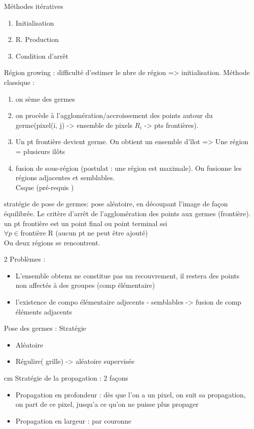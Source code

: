 \documentclass[11pt]{article}
\begin{document}
Méthodes itératives
\begin{enumerate}
	\item Initialisation
	\item R. Production
	\item Condition d'arrêt
\end{enumerate}

Région growing : difficulté d'estimer le nbre de région => initialisation. Méthode classique : 
\begin{enumerate}
	\item on sème des germes
	\item on procède à l'agglomération/accroissement des points autour du germe(pixel(i, j) -> ensemble de pixels $R_i$ -> pts frontières). 
	\item Un pt frontière devient germe. On obtient un ensemble d'îlot => Une région = plusieurs ilôts
	\item fusion de sous-région (postulat : une région est maximale). On fusionne les régions adjacentes et semblables.\\
		Csque (pré-requis )
\end{enumerate}

stratégie de pose de germes: pose aléatoire, en découpant l'image de façon équilibrée.
Le critère d'arrêt de l'agglomération des points aux germes (frontière).\\
un pt frontière est un point final ou point terminal ssi\\
$\forall p \in $frontière R (aucun pt ne peut être ajouté)\\
Ou deux régions se rencontrent.

\vskip 1cm 

2 Problèmes :
\begin{itemize}
	\item L'ensemble obtenu ne constitue pas un recouvrement, il restera des points non affectés à des groupes (comp élémentaire)
	\item l'existence de compo élémentaire adjecents - semblables -> fusion de comp éléments adjacents
\end{itemize}


\vskip 1cm
Pose des germes : Stratégie
\begin{itemize}
	\item Aléatoire
	\item Régulire( grille) -> aléatoire supervisée
\end{itemize}

 cm
Stratégie de la propagation : 2 façons
\begin{itemize}
	\item Propagation en profondeur : dès que l'on a un pixel, on suit sa propagation, on part de ce pixel, jusqu'a ce qu'on ne puisse plus propager
	\item Propagation en largeur : par couronne
\end{itemize}
\end{document}
